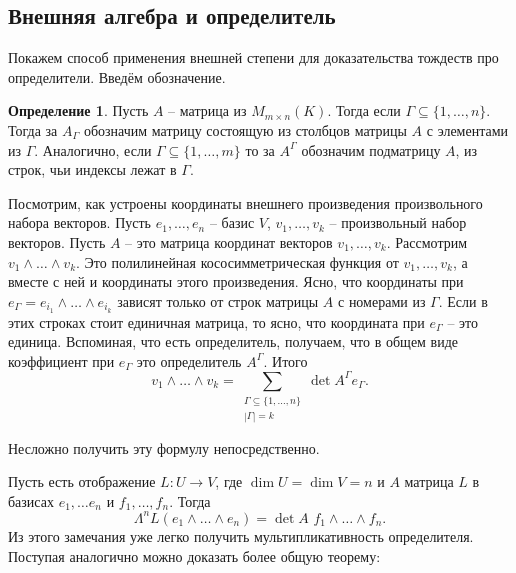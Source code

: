 \documentclass[10pt,a4paper,oneside]{book}
\theoremstyle{definition}
\newtheorem*{defn}{\color{yellow!30!red} Определение}
\def\dfn{\begin{defn}}
\def\edfn{\end{defn}}
\begin{document}
\subsection{Внешняя алгебра и определитель}

Покажем способ применения внешней степени для доказательства тождеств про определители. Введём обозначение.

\dfn Пусть $A$ -- матрица из $M_{m\times n}(K)$. Тогда если $\Gamma \subseteq \{1,\dots,n\}$. Тогда за $A_{\Gamma}$ обозначим матрицу состоящую из столбцов матрицы $A$ с элементами из $\Gamma$. Аналогично, если $\Gamma \subseteq \{1,\dots,m\}$ то за $A^{\Gamma}$ обозначим подматрицу $A$, из строк, чьи индексы лежат в $\Gamma$.
\edfn

Посмотрим, как устроены координаты внешнего произведения произвольного набора векторов. Пусть $e_1,\dots,e_n$ -- базис $V$, $v_1,\dots,v_k$ --  произвольный набор векторов. Пусть $A$ -- это матрица координат векторов $v_1,\dots,v_k$.
Рассмотрим $v_1 \wedge \dots \wedge v_k$. Это полилинейная кососимметрическая функция от $v_1,\dots,v_k$, а вместе с ней и координаты этого произведения. Ясно, что координаты при $e_{\Gamma}=e_{i_1}\wedge\dots\wedge e_{i_k}$ зависят только от строк матрицы $A$ с номерами из $\Gamma$. Если в этих строках стоит единичная матрица, то ясно, что координата при $e_{\Gamma}$ -- это единица. Вспоминая, что есть определитель, получаем, что в общем виде коэффициент при $e_{\Gamma}$ это определитель $A^{\Gamma}$. Итого 
$$v_1 \wedge \dots \wedge v_k= \sum_{\substack{\Gamma \subseteq \{1,\dots,n\}\\ |\Gamma|=k}} \det A^{\Gamma} e_{\Gamma}.$$

Несложно получить эту формулу непосредственно.

Пусть есть отображение $L \colon U \to V$, где $\dim U= \dim V = n$ и $A$ матрица $L$ в базисах $e_1,\dots e_n$ и $f_1,\dots,f_n$. Тогда $$\Lambda^n L(e_1\wedge \dots \wedge e_n) = \det A \,\,f_1 \wedge \dots \wedge f_n.$$
Из этого замечания уже легко получить мультипликативность определителя. Поступая аналогично можно доказать более общую теорему:
\end{document}
